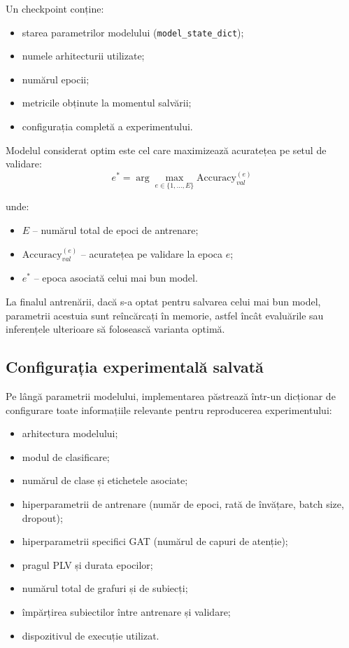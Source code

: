 \documentclass[12pt,a4paper]{report}
\theoremstyle{definition}
\theoremstyle{remark}
\begin{document}
Un checkpoint conține:
\begin{itemize}
    \item starea parametrilor modelului (\texttt{model\_state\_dict});
    \item numele arhitecturii utilizate;
    \item numărul epocii;
    \item metricile obținute la momentul salvării;
    \item configurația completă a experimentului.
\end{itemize}

Modelul considerat optim este cel care maximizează acuratețea pe setul de validare:
\begin{equation}
    e^{*} = \arg\max_{e \in \{1,\ldots,E\}} \text{Accuracy}_{val}^{(e)}
    \label{eq:best_epoch}
\end{equation}

\noindent unde:
\begin{itemize}
    \item $E$ -- numărul total de epoci de antrenare;
    \item $\text{Accuracy}_{val}^{(e)}$ -- acuratețea pe validare la epoca $e$;
    \item $e^{*}$ -- epoca asociată celui mai bun model.
\end{itemize}

La finalul antrenării, dacă s-a optat pentru salvarea celui mai bun model, parametrii acestuia sunt reîncărcați în memorie, astfel încât evaluările sau inferențele ulterioare să folosească varianta optimă.

\subsection{Configurația experimentală salvată}

Pe lângă parametrii modelului, implementarea păstrează într-un dicționar de configurare toate informațiile relevante pentru reproducerea experimentului:
\begin{itemize}
    \item arhitectura modelului;
    \item modul de clasificare;
    \item numărul de clase și etichetele asociate;
    \item hiperparametrii de antrenare (număr de epoci, rată de învățare, batch size, dropout);
    \item hiperparametrii specifici GAT (numărul de capuri de atenție);
    \item pragul PLV și durata epocilor;
    \item numărul total de grafuri și de subiecți;
    \item împărțirea subiectilor între antrenare și validare;
    \item dispozitivul de execuție utilizat.
\end{itemize}
\end{document}
